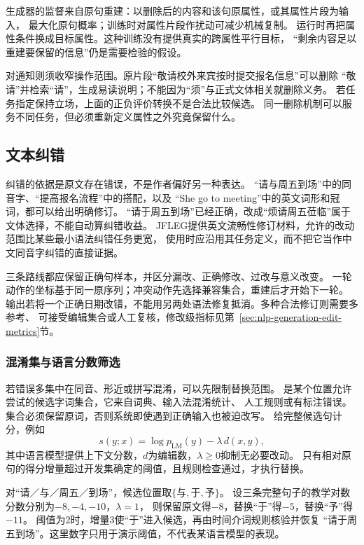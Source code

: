 生成器的监督来自原句重建：以删除后的内容和该句原属性，或其属性片段为输入，
最大化原句概率；训练时对属性片段作扰动可减少机械复制。
运行时再把属性条件换成目标属性。这种训练没有提供真实的跨属性平行目标，
“剩余内容足以重建要保留的信息”仍是需要检验的假设。

对通知则须收窄操作范围。原片段“敬请校外来宾按时提交报名信息”可以删除
“敬请”并检索“请”，生成易读说明；不能因为“须”与正式文体相关就删除义务。
若任务指定保持立场，上面的正负评价转换不是合法比较候选。
同一删除机制可以服务不同任务，但必须重新定义属性之外究竟保留什么。

\subsection{文本纠错}
\label{sec:nlp-generation-correction}

纠错的依据是原文存在错误，不是作者偏好另一种表达。
“请与周五到场”中的同音字、“提高报名流程”中的搭配，以及
“She go to meeting”中的英文词形和冠词，都可以给出明确修订。
“请于周五到场”已经正确，改成“烦请周五莅临”属于文体选择，不能自动算纠错收益。
JFLEG提供英文流畅性修订材料，允许的改动范围比某些最小语法纠错任务更宽，
使用时应沿用其任务定义，而不把它当作中文同音字纠错的直接证据。

三条路线都应保留正确句样本，并区分漏改、正确修改、过改与意义改变。
一轮动作的坐标基于同一原序列；冲突动作先选择兼容集合，重建后才开始下一轮。
输出若将一个正确日期改错，不能用另两处语法修复抵消。多种合法修订则需要多参考、
可接受编辑集合或人工复核，修改级指标见第~\ref{sec:nlp-generation-edit-metrics}节。

\subsubsection{混淆集与语言分数筛选}
\label{sec:nlp-generation-confusion}

若错误多集中在同音、形近或拼写混淆，可以先限制替换范围。
是某个位置允许尝试的候选字词集合，它来自词典、输入法混淆统计、
人工规则或有标注错误。集合必须保留原词，否则系统即使遇到正确输入也被迫改写。
给完整候选句计分，例如
\begin{equation}
  s(y;x)=\log p_{\mathrm{LM}}(y)-\lambda\,d(x,y),
  \label{eq:nlp-generation-confusion-score}
\end{equation}
其中语言模型提供上下文分数，$d$为编辑数，$\lambda\geq0$抑制无必要改动。
只有相对原句的得分增量超过开发集确定的阈值，且规则检查通过，才执行替换。

对“请／与／周五／到场”，候选位置取$\{\text{与},\text{于},\text{予}\}$。
设三条完整句子的教学对数分数分别为$-8,-4,-10$，$\lambda=1$，
则保留原文得$-8$，替换“于”得$-5$，替换“予”得$-11$。
阈值为2时，增量3使“于”进入候选，再由时间介词规则核验并恢复
“请于周五到场”。这里数字只用于演示阈值，不代表某语言模型的表现。

